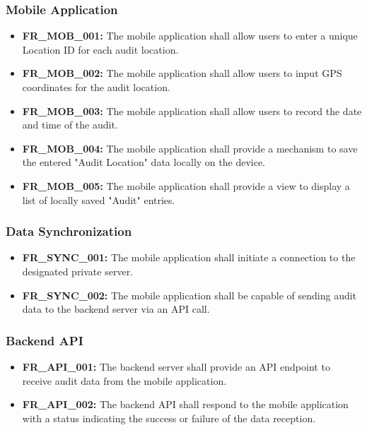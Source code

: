 \documentclass[12pt]{article}
\begin{document}
\subsubsection{Mobile Application}

\begin{itemize}
    \item \textbf{FR\_MOB\_001:} The mobile application shall allow users to enter a unique Location ID for each audit location.
    \item \textbf{FR\_MOB\_002:} The mobile application shall allow users to input GPS coordinates for the audit location.
    \item \textbf{FR\_MOB\_003:} The mobile application shall allow users to record the date and time of the audit.
    \item \textbf{FR\_MOB\_004:} The mobile application shall provide a mechanism to save the entered "Audit Location" data locally on the device.
    \item \textbf{FR\_MOB\_005:} The mobile application shall provide a view to display a list of locally saved "Audit" entries.
\end{itemize}

\subsubsection{Data Synchronization}

\begin{itemize}
    \item \textbf{FR\_SYNC\_001:} The mobile application shall initiate a connection to the designated private server.
    \item \textbf{FR\_SYNC\_002:} The mobile application shall be capable of sending audit data to the backend server via an API call.
\end{itemize}

\subsubsection{Backend API}

\begin{itemize}
    \item \textbf{FR\_API\_001:} The backend server shall provide an API endpoint to receive audit data from the mobile application.
    \item \textbf{FR\_API\_002:} The backend API shall respond to the mobile application with a status indicating the success or failure of the data reception.
\end{itemize}
\end{document}
